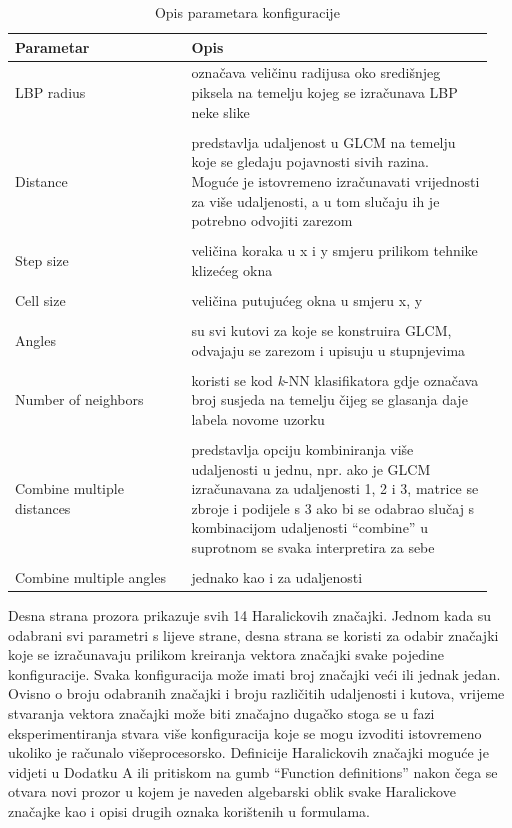 \documentclass[times, utf8, zavrsni]{fer}
\begin{document}
\begin{table}
\begin{tabular}{p{0.35\linewidth} | p{0.6\linewidth}}
Parametar & Opis \\
\hline
LBP radius & označava veličinu radijusa oko središnjeg piksela
na temelju kojeg se izračunava LBP neke slike \\

\\
\hline
Distance & predstavlja udaljenost u GLCM na temelju koje 
se gledaju pojavnosti sivih razina. Moguće je istovremeno izračunavati vrijednosti
za više udaljenosti, a u tom slučaju ih je potrebno odvojiti zarezom \\

\\
\hline
Step size & veličina koraka u x i y smjeru prilikom tehnike klizećeg okna \\

\\
\hline
Cell size & veličina putujućeg okna u smjeru x, y \\

\\
\hline
Angles & su svi kutovi za koje se konstruira GLCM, odvajaju
se zarezom i upisuju u stupnjevima \\

\\
\hline
Number of neighbors & koristi se kod \textit{k}-NN klasifikatora
gdje označava broj susjeda na temelju čijeg se glasanja daje labela novome uzorku \\

\\
\hline
Combine multiple distances & predstavlja opciju kombiniranja više
udaljenosti u jednu, npr. ako je GLCM izračunavana za udaljenosti 1, 2 i 3, matrice
se zbroje i podijele s 3 ako bi se odabrao slučaj s kombinacijom udaljenosti \enquote{combine}
u suprotnom se svaka interpretira za sebe \\

\\
\hline
Combine multiple angles & jednako kao i za udaljenosti

\end{tabular}
\caption{Opis parametara konfiguracije}
\end{table}

\bigbreak

Desna strana prozora prikazuje svih 14 Haralickovih značajki. Jednom kada 
su odabrani svi parametri s lijeve strane, desna strana se koristi za odabir 
značajki koje se izračunavaju prilikom kreiranja vektora značajki svake pojedine
konfiguracije. Svaka konfiguracija može imati broj značajki veći ili jednak jedan. 
Ovisno o broju odabranih značajki i broju različitih udaljenosti i kutova, vrijeme
stvaranja vektora značajki može biti značajno dugačko stoga se u fazi eksperimentiranja
stvara više konfiguracija koje se mogu izvoditi istovremeno ukoliko je računalo
višeprocesorsko. Definicije Haralickovih značajki moguće je vidjeti u Dodatku A
ili pritiskom na gumb \enquote{Function definitions} nakon čega se otvara novi
prozor u kojem je naveden algebarski oblik svake Haralickove značajke kao i 
opisi drugih oznaka korištenih u formulama. 
\end{document}
